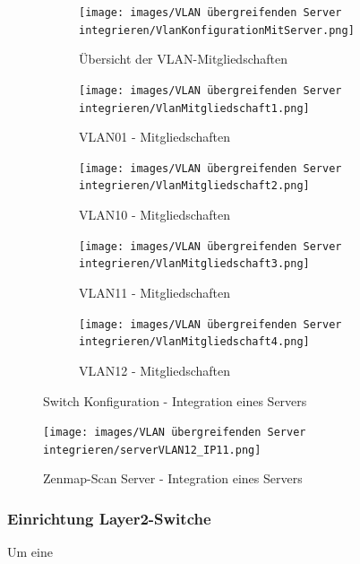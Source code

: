        \begin{figure}[H]
        \centering
            \begin{subfigure}{\linewidth}
                \centering
                \texttt{[image: images/VLAN übergreifenden Server integrieren/VlanKonfigurationMitServer.png]}
                \caption{Übersicht der VLAN-Mitgliedschaften}
            \end{subfigure}
            \begin{subfigure}{.49\linewidth}
                \centering
                \texttt{[image: images/VLAN übergreifenden Server integrieren/VlanMitgliedschaft1.png]}
                \caption{VLAN01 - Mitgliedschaften}
            \end{subfigure}
            \begin{subfigure}{.49\linewidth}
                \centering
                \texttt{[image: images/VLAN übergreifenden Server integrieren/VlanMitgliedschaft2.png]}
                \caption{VLAN10 - Mitgliedschaften}
            \end{subfigure}
            \begin{subfigure}{.49\linewidth}
                \centering
                \texttt{[image: images/VLAN übergreifenden Server integrieren/VlanMitgliedschaft3.png]}
                \caption{VLAN11 - Mitgliedschaften}
            \end{subfigure}
            \begin{subfigure}{.49\linewidth}
                \centering
                \texttt{[image: images/VLAN übergreifenden Server integrieren/VlanMitgliedschaft4.png]}
                \caption{VLAN12 - Mitgliedschaften}
            \end{subfigure}
        \caption{Switch Konfiguration - Integration eines Servers}
        \end{figure}
        \begin{figure}[H]
            \centering
            \texttt{[image: images/VLAN übergreifenden Server integrieren/serverVLAN12\_IP11.png]}
            \caption{Zenmap-Scan Server - Integration eines Servers}
        \end{figure}

        \newpage
        \subsubsection{Einrichtung Layer2-Switche}
        Um eine 
